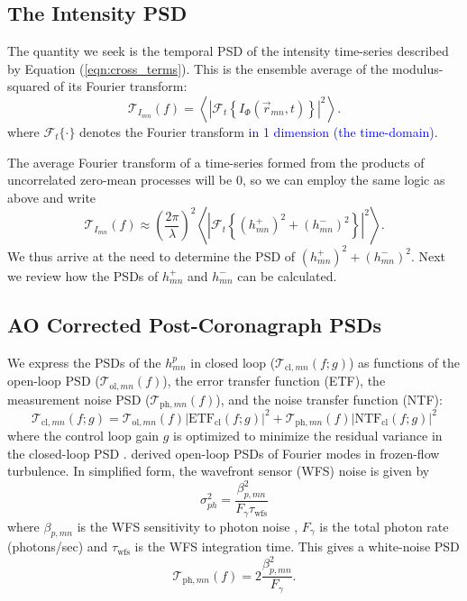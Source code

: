 \documentclass[10pt,preprint]{aastex631}
\newcommand{\jrmadd}[1]{\textcolor{blue}{#1}}
\begin{document}
\subsection{The Intensity PSD}

The quantity we seek is the temporal PSD of the intensity time-series described by Equation (\ref{eqn:cross_terms}).  This is the ensemble average of the modulus-squared of its Fourier transform:
\begin{equation}
\mathcal{T}_{I_{mn}}(f) = \left\langle \left| \mathcal{F}_t \left\{ I_\Phi(\vec{r}_{mn},t) \right\} \right|^2 \right\rangle.
\end{equation}
where $\mathcal{F}_t\{\cdot\}$ denotes the Fourier transform \jrmadd{in 1 dimension (the time-domain)}.

The average Fourier transform of a time-series formed from the products of uncorrelated zero-mean processes will be 0, so we can employ the same logic as above and write
\begin{equation}
\mathcal{T}_{I_{mn}}(f) \approx \left(\frac{2\pi}{\lambda}\right)^2  \left\langle \left| \mathcal{F}_t\left\{   (h_{mn}^{+})^2 + (h_{mn}^{-})^2  \right\} \right|^2 \right\rangle  .
\label{eqn:psd_h2}
\end{equation}
We thus arrive at the need to determine the PSD of $(h_{mn}^{+})^2 + (h_{mn}^{-})^2$.  Next we review how the PSDs of $h_{mn}^{+}$ and $h_{mn}^{-}$ can be calculated.

\subsection{AO Corrected Post-Coronagraph PSDs}

We express the PSDs of the $h_{mn}^p$ in closed loop ($\mathcal{T}_{\mathrm{cl},mn}(f;g)$) as functions of the open-loop PSD ($\mathcal{T}_{\mathrm{ol},mn}(f)$), the error transfer function (ETF), the measurement noise PSD ($\mathcal{T}_{\mathrm{ph},mn}(f)$), and the noise transfer function (NTF): 
\begin{equation}
\mathcal{T}_{\mathrm{cl},mn}(f;g) = \mathcal{T}_{\mathrm{ol},mn}(f) \left| \mbox{ETF}_{\mathrm{cl}}(f;g) \right|^2 + \mathcal{T}_{\mathrm{ph},mn}(f) \left| \mbox{NTF}_{\mathrm{cl}}(f;g) \right|^2 
\label{eqn:cl_psd}
\end{equation}
where the control loop gain $g$ is optimized to minimize the residual variance in the closed-loop PSD \citep{1999aoa..book.....R_ch6,2016ApOpt..55..323P}. \citet{2018JATIS...4a9001M} derived open-loop PSDs of Fourier modes in frozen-flow turbulence.  In simplified form, the wavefront sensor (WFS) noise is given by
\begin{equation}
\sigma_{ph}^2 = \frac{\beta_{p,mn}^2}{F_\gamma \tau_\mathrm{wfs}}
\label{eqn:photon_noise}
\end{equation}
where $\beta_{p,mn}$ is the WFS sensitivity to photon noise \citep{2005ApJ...629..592G}, $F_\gamma$ is the total photon rate (photons/sec) and $\tau_\mathrm{wfs}$ is the WFS integration time.  This gives a white-noise PSD
\begin{equation}
\mathcal{T}_{\mathrm{ph},mn}(f) = 2\frac{\beta_{p,mn}^2}{F_\gamma }.
\end{equation}
\end{document}
